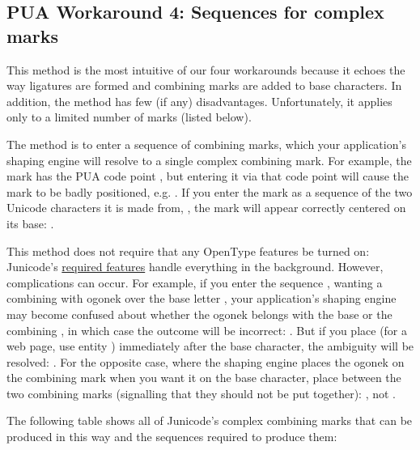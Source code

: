 \subsection{PUA Workaround 4: Sequences for complex marks}

This method is the most intuitive of our four workarounds because it echoes the way ligatures 
are formed and combining marks are added to base characters. In addition, the method has few 
(if any) disadvantages. Unfortunately, it applies only to a limited number of marks (listed below).

The method is to enter a sequence of combining marks,
which your application's shaping engine will resolve to a single complex combining mark. For example, the mark
 has the PUA code point , but entering it via that code point will cause the mark to be
badly positioned, e.g. . If you enter the mark as a sequence of the two Unicode characters it is made from,
, the mark will appear correctly centered on its base:
.

This method does not require that any OpenType features be turned on: Junicode’s
\hyperlink{req}{required features} handle 
everything in the background. However, complications can occur. For example, if you enter the sequence 
, wanting a combining  with ogonek over the base 
letter , your application’s shaping engine may become confused about whether the ogonek belongs with the 
base  or the combining , in which case the outcome will be incorrect: . 
But if you place   (for a web page, use entity ) immediately after the 
base character, the ambiguity will be resolved: 
. For the opposite case, where the shaping engine places the
ogonek on the combining mark when you want it on the base character, place 
between the two combining marks (signalling that they should not be put together): ,
not .

The following table shows all of Junicode’s complex combining marks that can be produced in this way and 
the sequences required to produce them:


